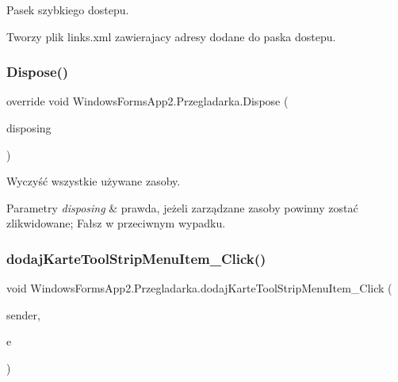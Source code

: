 Pasek szybkiego dostepu.

Tworzy plik links.\+xml zawierajacy adresy dodane do paska dostepu. \mbox{\label{class_windows_forms_app2_1_1_przegladarka_a1952e96668e9dae2dd62a80771162925}} 
\subsubsection{\texorpdfstring{Dispose()}{Dispose()}}
{\footnotesize\ttfamily override void Windows\+Forms\+App2.\+Przegladarka.\+Dispose (\begin{DoxyParamCaption}\item[{bool}]{disposing }\end{DoxyParamCaption})\hspace{0.3cm}{\ttfamily [protected]}}



Wyczyść wszystkie używane zasoby. 


\begin{DoxyParams}{Parametry}
{\em disposing} & prawda, jeżeli zarządzane zasoby powinny zostać zlikwidowane; Fałsz w przeciwnym wypadku.\\
\hline
\end{DoxyParams}
\mbox{\label{class_windows_forms_app2_1_1_przegladarka_a1a65fd7d680f3af4d036af3992129a81}} 
\subsubsection{\texorpdfstring{dodaj\+Karte\+Tool\+Strip\+Menu\+Item\+\_\+\+Click()}{dodajKarteToolStripMenuItem\_Click()}}
{\footnotesize\ttfamily void Windows\+Forms\+App2.\+Przegladarka.\+dodaj\+Karte\+Tool\+Strip\+Menu\+Item\+\_\+\+Click (\begin{DoxyParamCaption}\item[{object}]{sender,  }\item[{Event\+Args}]{e }\end{DoxyParamCaption})\hspace{0.3cm}{\ttfamily [private]}}

